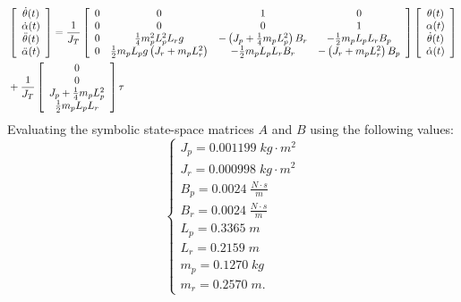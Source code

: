 \begin{align*}
     & \left[\begin{array}{c}
            \dot{\theta}(t)  \\
            \dot{\alpha}(t)  \\
            \ddot{\theta}(t) \\
            \ddot{\alpha}(t)
        \end{array}\right] = \frac{1}{J_T}
    \left[\begin{array}{c c c c}
            0 & 0                                                    & 1                                              & 0                                  \\
            0 & 0                                                    & 0                                              & 1                                  \\
            0 & \frac{1}{4} m_{p}^2 L_{p}^2 L_r g                    & -\left(J_p + \frac{1}{4} m_p L_{p}^2\right)B_r & -\frac{1}{2} m_p L_p L_r B_p       \\
            0 & \frac{1}{2} m_p L_p g \left(J_r + m_p L_{r}^2\right) & -\frac{1}{2} m_p L_p L_r B_r                   & -\left(J_r + m_p L_{r}^2\right)B_p
        \end{array}\right]
    \left[\begin{array}{c}
            \theta(t)       \\
            \alpha(t)       \\
            \dot{\theta}(t) \\
            \dot{\alpha}(t)
        \end{array}\right]                    \\
     & + \frac{1}{J_T}
    \left[\begin{array}{c}
            0                             \\
            0                             \\
            J_p + \frac{1}{4} m_p L_{p}^2 \\
            \frac{1}{2} m_p L_p L_r
        \end{array}\right] \tau
\end{align*}
Evaluating the symbolic state-space matrices $A$ and $B$ using the following values:
\[
    \begin{cases}
        J_p = 0.001199 \; kg \cdot m^2     \\
        J_r = 0.000998 \; kg \cdot m^2     \\
        B_p = 0.0024 \; \frac{N\cdot s}{m} \\
        B_r = 0.0024 \; \frac{N\cdot s}{m} \\
        L_p = 0.3365 \; m                  \\
        L_r = 0.2159 \; m                  \\
        m_p = 0.1270 \; kg                 \\
        m_r = 0.2570 \; m.
    \end{cases}
\]

